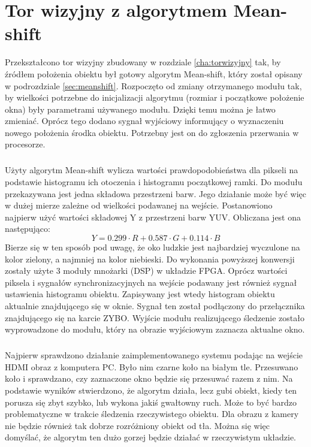 \chapter{Tor wizyjny z algorytmem Mean-shift}
\label{cha:torwizyjnyzalgorytmemmeanshift}

Przekształcono tor wizyjny zbudowany w rozdziale \ref{cha:torwizyjny} tak, by źródłem położenia obiektu był gotowy algorytm Mean-shift, który został opisany w podrozdziale \ref{sec:meanshift}. 
Rozpoczęto od zmiany otrzymanego modułu tak, by wielkości potrzebne do inicjalizacji algorytmu (rozmiar i początkowe położenie okna) były parametrami używanego modułu. Dzięki temu można je łatwo zmieniać.
Oprócz tego dodano sygnał wyjściowy informujący o wyznaczeniu nowego położenia środka obiektu. Potrzebny jest on do zgłoszenia przerwania w procesorze.

\paragraph*{}
Użyty algorytm Mean-shift wylicza wartości prawdopodobieństwa dla pikseli na podstawie histogramu ich otoczenia i histogramu początkowej ramki. Do modułu przekazywana jest jedna składowa przestrzeni barw.
Jego działanie może być więc w dużej mierze zależne od wielkości podawanej na wejście.
Postanowiono najpierw użyć wartości składowej Y z przestrzeni barw YUV.
Obliczana jest ona następująco:
\begin{equation}
\label{eq:grayscale}
Y=0.299 \cdot R+0.587 \cdot G+0.114 \cdot B
\end{equation}
Bierze się w ten sposób pod uwagę, że oko ludzkie jest najbardziej wyczulone na kolor zielony, a najmniej na kolor niebieski. 
Do wykonania powyższej konwersji zostały użyte 3 moduły mnożarki (DSP) w układzie FPGA.
Oprócz wartości piksela i sygnałów synchronizacyjnych na wejście podawany jest również sygnał ustawienia histogramu obiektu. 
Zapisywany jest wtedy histogram obiektu aktualnie znajdującego się w oknie. 
Sygnał ten został podłączony do przełącznika znajdującego się na karcie ZYBO. 
Wyjście modułu realizującego śledzenie zostało wyprowadzone do modułu, który na obrazie wyjściowym zaznacza aktualne okno.

\paragraph*{}
Najpierw sprawdzono działanie zaimplementowanego systemu podając na wejście HDMI obraz z komputera PC. 
Było nim czarne koło na białym tle. 
Przesuwano koło i sprawdzano, czy zaznaczone okno będzie się przesuwać razem z nim. 
Na podstawie wyników stwierdzono, że algorytm działa, lecz gubi obiekt, kiedy ten porusza się zbyt szybko, lub wykona jakiś gwałtowny ruch. 
Może to być bardzo problematyczne w trakcie śledzenia rzeczywistego obiektu. 
Dla obrazu z kamery nie będzie również tak dobrze rozróżniony obiekt od tła. 
Można się więc domyślać, że algorytm ten dużo gorzej będzie działać w rzeczywistym układzie.

